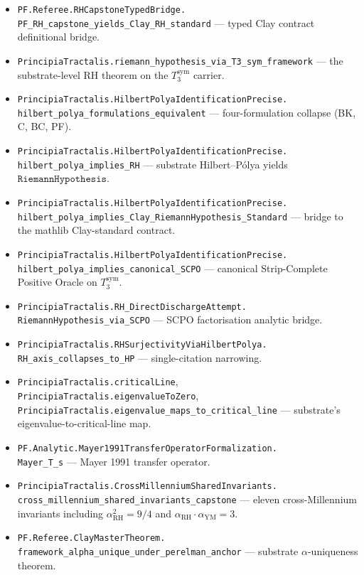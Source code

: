 \documentclass[11pt,a4paper]{article}
\theoremstyle{plain}
\theoremstyle{definition}
\begin{document}
\begin{itemize}[leftmargin=*,nosep]
\item \texttt{PF.Referee.RHCapstoneTypedBridge.\\
  PF\_RH\_capstone\_yields\_Clay\_RH\_standard}
  --- typed Clay contract definitional bridge.
\item \texttt{PrincipiaTractalis.riemann\_hypothesis\_via\_T3\_sym\_framework}
  --- the substrate-level RH theorem on the $T_{3}^{\mathrm{sym}}$
  carrier.
\item \texttt{PrincipiaTractalis.HilbertPolyaIdentificationPrecise.\\
  hilbert\_polya\_formulations\_equivalent}
  --- four-formulation collapse (BK, C, BC, PF).
\item \texttt{PrincipiaTractalis.HilbertPolyaIdentificationPrecise.\\
  hilbert\_polya\_implies\_RH}
  --- substrate Hilbert--P\'olya yields $\mathtt{RiemannHypothesis}$.
\item \texttt{PrincipiaTractalis.HilbertPolyaIdentificationPrecise.\\
  hilbert\_polya\_implies\_Clay\_RiemannHypothesis\_Standard}
  --- bridge to the mathlib Clay-standard contract.
\item \texttt{PrincipiaTractalis.HilbertPolyaIdentificationPrecise.\\
  hilbert\_polya\_implies\_canonical\_SCPO}
  --- canonical Strip-Complete Positive Oracle on
  $T_{3}^{\mathrm{sym}}$.
\item \texttt{PrincipiaTractalis.RH\_DirectDischargeAttempt.\\
  RiemannHypothesis\_via\_SCPO}
  --- SCPO factorisation analytic bridge.
\item \texttt{PrincipiaTractalis.RHSurjectivityViaHilbertPolya.\\
  RH\_axis\_collapses\_to\_HP}
  --- single-citation narrowing.
\item \texttt{PrincipiaTractalis.criticalLine},
  \texttt{PrincipiaTractalis.eigenvalueToZero},
  \texttt{PrincipiaTractalis.eigenvalue\_maps\_to\_critical\_line}
  --- substrate's eigenvalue-to-critical-line map.
\item \texttt{PF.Analytic.Mayer1991TransferOperatorFormalization.\\
  Mayer\_T\_s} --- Mayer 1991 transfer operator.
\item \texttt{PrincipiaTractalis.CrossMillenniumSharedInvariants.\\
  cross\_millennium\_shared\_invariants\_capstone}
  --- eleven cross-Millennium invariants including
  $\alpha_{\mathrm{RH}}^{2} = 9/4$ and
  $\alpha_{\mathrm{RH}} \cdot \alpha_{\mathrm{YM}} = 3$.
\item \texttt{PF.Referee.ClayMasterTheorem.\\
  framework\_alpha\_unique\_under\_perelman\_anchor}
  --- substrate $\alpha$-uniqueness theorem.
\end{itemize}
\end{document}
